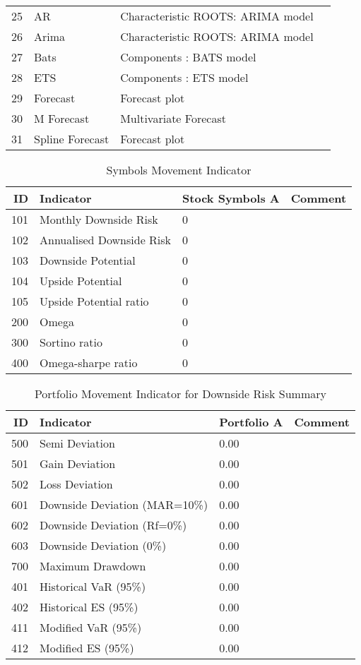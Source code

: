 \begin{table}
\begin{tabular}{r|p{4cm}|ll}
		\hline
		25 & AR	 & Characteristic ROOTS: ARIMA model  & \\
		26 & Arima & Characteristic ROOTS: ARIMA model  & \\
		27 & Bats & Components : BATS model  & \\
		28 & ETS & Components : ETS model  & \\
		29 & Forecast & Forecast plot  & \\
		30 & M Forecast & Multivariate Forecast  & \\
		31 & Spline Forecast & 	Forecast plot  & \\
		\hline
	\end{tabular}
\end{table}


\begin{table}[ht]
	\caption{Symbols Movement Indicator \cite{key100}}
	\begin{tabular}{rlll}
		\hline
		ID & Indicator & Stock Symbols A & Comment \\
		\hline
		101 & Monthly Downside Risk & 0 & \\ 
		102 & Annualised Downside Risk & 0 & \\ 
		103 & Downside Potential & 0 & \\ 
		104 & Upside Potential & 0 & \\ 
		105 & Upside Potential ratio & 0 & \\ 
		200 & Omega & 0 &  \\ 
		300 & Sortino ratio & 0 & \\ 
		400 & Omega-sharpe ratio & 0 & \\ 
		\hline
	\end{tabular}
\end{table}

\begin{table}[ht]
	\caption{Portfolio Movement Indicator for Downside Risk Summary \cite{key400}}
	\begin{tabular}{r|p{4cm}|ll}
		\hline
		ID & Indicator & Portfolio A & Comment \\
		\hline
		500 & Semi Deviation & 0.00 & \\ 
		501 & Gain Deviation & 0.00 & \\ 
		502 & Loss Deviation & 0.00 &  \\ 
		\hline
		601 & Downside Deviation (MAR=10\%) & 0.00 & \\ 
		602 & Downside Deviation (Rf=0\%) & 0.00 & \\ 
		603 & Downside Deviation (0\%) & 0.00 & \\ 
		\hline
		700 & Maximum Drawdown & 0.00 & \\ 
		\hline
		401 & Historical VaR (95\%) & 0.00 & \\ 
		402 & Historical ES (95\%) &  0.00 &  \\ 
		\hline
		411 & Modified VaR (95\%) &  0.00 & \\ 
		412 & Modified ES (95\%) &  0.00 &  \\ 
		\hline
	\end{tabular}
\end{table}


